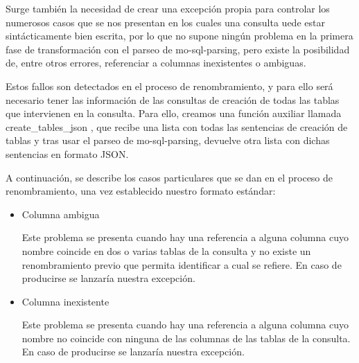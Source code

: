 Surge también la necesidad de crear una excepción propia para controlar los numerosos casos que se nos presentan en los cuales una consulta uede estar sintácticamente bien escrita, por lo que no supone ningún problema en la primera fase de transformación con el parseo de mo-sql-parsing, pero existe la posibilidad de, entre otros errores, referenciar a columnas inexistentes o ambiguas. 

Estos fallos son detectados en el proceso de renombramiento, y para ello será necesario tener las información de las consultas de creación de todas las tablas que intervienen en la consulta. Para ello, creamos una función auxiliar llamada create\_tables\_json , que recibe una lista con todas las sentencias de creación de tablas y tras usar el parseo de mo-sql-parsing, devuelve otra lista con dichas sentencias en formato JSON.

A continuación, se describe los casos particulares que se dan en el proceso de renombramiento, una vez establecido nuestro formato estándar:

\begin{itemize}
    \item Columna ambigua
    
    Este problema se presenta cuando hay una referencia a alguna columna cuyo nombre coincide en dos o varias tablas de la consulta y no existe un renombramiento previo que permita identificar a cual se refiere. En caso de producirse se lanzaría nuestra excepción.

    \item Columna inexistente
    
    Este problema se presenta cuando hay una referencia a alguna columna cuyo nombre no coincide con ninguna de las columnas de las tablas de la consulta. En caso de producirse se lanzaría nuestra excepción.
\end{itemize}
